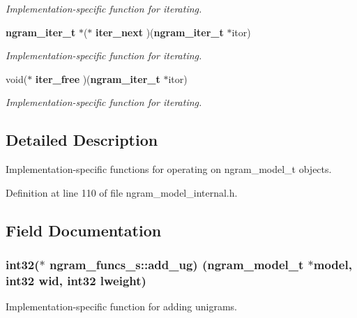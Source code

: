 \begin{DoxyCompactItemize}
\begin{DoxyCompactList}\small\item\em Implementation-\/specific function for iterating. \end{DoxyCompactList}\item 
{\bf ngram\+\_\+iter\+\_\+t} $\ast$($\ast$ {\bf iter\+\_\+next} )({\bf ngram\+\_\+iter\+\_\+t} $\ast$itor)\label{structngram__funcs__s_aef779dc7dc14cabd390b1bf08946d9c1}

\begin{DoxyCompactList}\small\item\em Implementation-\/specific function for iterating. \end{DoxyCompactList}\item 
void($\ast$ {\bf iter\+\_\+free} )({\bf ngram\+\_\+iter\+\_\+t} $\ast$itor)\label{structngram__funcs__s_ac073f51673d16dbe0c2f175babd4b6ba}

\begin{DoxyCompactList}\small\item\em Implementation-\/specific function for iterating. \end{DoxyCompactList}\end{DoxyCompactItemize}


\subsection{Detailed Description}
Implementation-\/specific functions for operating on ngram\+\_\+model\+\_\+t objects. 

Definition at line 110 of file ngram\+\_\+model\+\_\+internal.\+h.



\subsection{Field Documentation}
\subsubsection[{add\+\_\+ug}]{\setlength{\rightskip}{0pt plus 5cm}int32($\ast$ ngram\+\_\+funcs\+\_\+s\+::add\+\_\+ug) ({\bf ngram\+\_\+model\+\_\+t} $\ast$model, int32 wid, int32 lweight)}\label{structngram__funcs__s_aec7921e64c7cc778fa2267d6717482c3}


Implementation-\/specific function for adding unigrams. 

